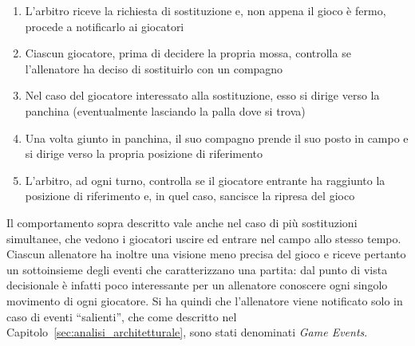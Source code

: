\begin{enumerate}
	\item L'arbitro riceve la richiesta di sostituzione e, non appena il gioco è fermo, procede a notificarlo ai giocatori
	\item Ciascun giocatore, prima di decidere la propria mossa, controlla se l'allenatore ha deciso di sostituirlo con un compagno
	\item Nel caso del giocatore interessato alla sostituzione, esso si dirige verso la panchina (eventualmente lasciando la palla dove si trova)
	\item Una volta giunto in panchina, il suo compagno prende il suo posto in campo e si dirige verso la propria posizione di riferimento
	\item L'arbitro, ad ogni turno, controlla se il giocatore entrante ha raggiunto la posizione di riferimento e, in quel caso, sancisce la ripresa del gioco
\end{enumerate}

Il comportamento sopra descritto vale anche nel caso di più sostituzioni simultanee, che vedono i giocatori uscire ed entrare nel campo allo stesso tempo.\\

Ciascun allenatore ha inoltre una visione meno precisa del gioco e riceve pertanto un sottoinsieme degli eventi che caratterizzano una partita: dal punto di vista decisionale è infatti poco interessante per un allenatore conoscere ogni singolo movimento di ogni giocatore. Si ha quindi che l'allenatore viene notificato solo in caso di eventi ``salienti'', che come descritto nel Capitolo~\ref{sec:analisi_architetturale}, sono stati denominati \textit{Game Events}.

%
%
